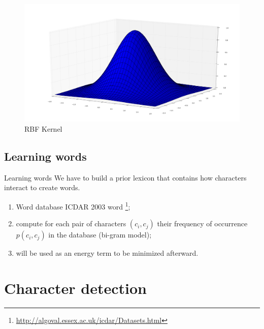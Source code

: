 \documentclass[handout]{beamer}
\begin{document}
\begin{frame}
\begin{figure}%
\includegraphics[width=\columnwidth]{figures/blob.png}%
\caption{RBF Kernel}%
\label{RBFKernel}%
\end{figure}
\end{frame}



\subsection{Learning words}

\begin{frame}{Learning words}
We have to build a prior lexicon that contains how characters interact to create words.
\begin{enumerate}
	\item Word database ICDAR 2003 word \cite{ICDARword}\footnote{\url{http://algoval.essex.ac.uk/icdar/Datasets.html}};
	\item compute for each pair of characters $(c_i,c_j)$ their frequency of occurrence $p(c_i,c_j)$ in the database (bi-gram model);
	\item will be used as an energy term to be minimized afterward.
\end{enumerate}
\end{frame}





\section{Character detection}

\end{document}
